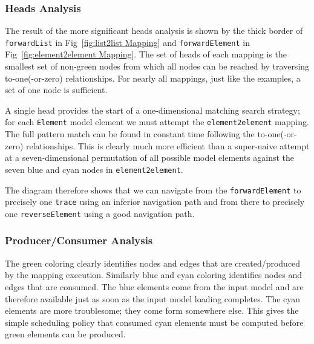 \documentclass{llncs}
\begin{document}
\subsubsection{Heads Analysis}The result of the more significant heads analysis is shown by the thick border of \verb$forwardList$ in Fig~\ref{fig:list2list Mapping} and \verb$forwardElement$ in Fig~\ref{fig:element2element Mapping}. The set of heads of each mapping is the smallest set of non-green nodes from which all nodes can be reached by traversing to-one(-or-zero) relationships. For nearly all mappings, just like the examples, a set of one node is sufficient.

A single head provides the start of a one-dimensional matching search strategy; for each \verb$Element$ model element we must attempt the \verb$element2element$ mapping. The full pattern match can be found in constant time following the to-one(-or-zero) relationships. This is clearly much more efficient than a super-naive attempt at a seven-dimensional permutation of all possible model elements against the seven blue and cyan nodes in \verb$element2element$.

The diagram therefore shows that we can navigate from the \verb$forwardElement$ to precisely one \verb$trace$ using an inferior navigation path and from there to precisely one \verb$reverseElement$ using a good navigation path. %



\subsubsection{Producer/Consumer Analysis}The green coloring clearly identifies nodes and edges that are created/produced by the mapping execution. Similarly blue and cyan coloring identifies nodes and edges that are consumed. The blue elements come from the input model and are therefore available just as soon as the input model loading completes. The cyan elements are more troublesome; they come form somewhere else. This gives the simple  scheduling policy that consumed cyan elements must be computed before green elements can be produced.
\end{document}
